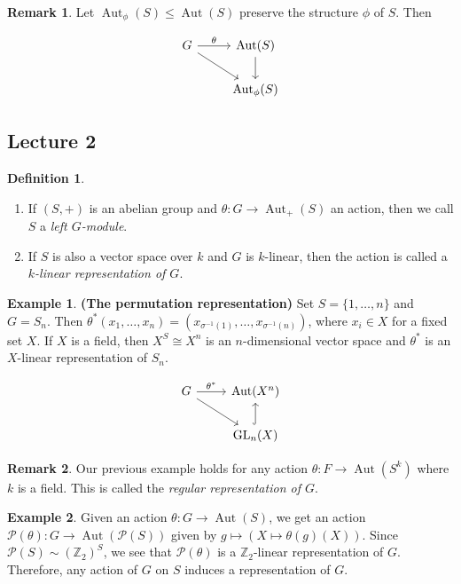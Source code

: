 \documentclass[10pt,letterpaper,cm]{nupset}
\theoremstyle{definition}
\newtheorem*{definition}{Definition}
\newtheorem{exmp}{Example}
\newtheorem{remark}{Remark}
\renewcommand{\P}{\mathcal P}
\newcommand{\Z}{\mathbb Z}
\newcommand{\1}{\mathbf{1}}
\newcommand{\0}{\vec 0}
\DeclareMathOperator*{\GL}{GL}
\DeclareMathOperator{\aut}{Aut}
\begin{document}
\begin{remark} Let $\aut_\phi(S) \leq \aut(S)$ preserve the structure $\phi$ of $S$. Then 

\[ \begin{tikzcd}
G \arrow{r}{\theta} \arrow[swap]{dr} & \aut(S) \arrow{d} \\%
 & \aut_\phi(S)
\end{tikzcd}
\]

\end{remark}

\subsection{Lecture 2}


\begin{definition}  $ $
\begin{enumerate}
\item If $(S, +)$ is an abelian group and $\theta : G \to \aut_+(S)$ an action, then we call $S$ a \textit{left $G$-module}.
\item If $S$ is also a vector space over $k$ and $G$ is $k$-linear, then the action is called a \textit{$k$-linear representation of $G$}.
\end{enumerate}
\end{definition}

\begin{exmp}{\textbf{(The permutation representation)}}
Set $S = \{1, \ldots, n\}$ and $G = S_n$. Then $\theta^{\ast}(x_1, \ldots, x_n) = (x_{\sigma^{-1}(1)}, \ldots, x_{\sigma^{-1}(n)})$, where $x_i \in X$ for a fixed set $X$. If $X$ is a field, then $X^S \cong X^n$ is an $n$-dimensional vector space and $\theta^\ast$ is an $X$-linear representation of $S_n$.

\[ \begin{tikzcd}
G \arrow{r}{\theta^{\ast}} \arrow[swap]{dr} & \aut(X^n) \\%
 & \GL_n(X) \arrow[hookrightarrow]{u}
\end{tikzcd}
\]

\end{exmp}

\begin{remark}
Our previous example holds for any action $\theta: F \to \aut(S^k)$ where $k$ is a field. This is called the \textit{regular representation of $G$}.
\end{remark}

\begin{exmp}
Given an action $\theta: G \to \aut(S)$, we get an action $\P(\theta): G \to \aut(\P(S))$ given by $g \mapsto (X \mapsto \theta(g)(X))$. Since $\P(S) \sim (\Z_2)^S$, we see that $\P(\theta)$  is a $\Z_2$-linear representation of $G$. Therefore, any action of $G$ on $S$ induces a representation of $G$.
\end{exmp}
\end{document}
